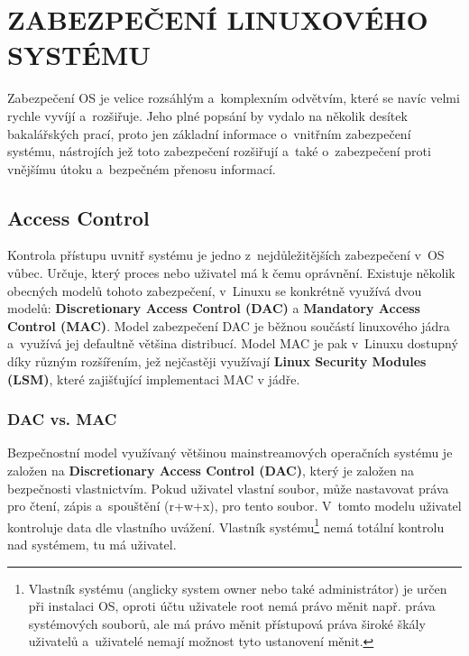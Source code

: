 \documentclass[a4paper,12pt]{article}
\newcommand{\upc}[1]{\uppercase{#1}} %
\renewcommand{\b}[1]{\textbf{#1}} %
\begin{document}
\section{\upc{Zabezpečení Linuxového systému}}
Zabezpečení OS je velice rozsáhlým a~komplexním odvětvím, které se navíc velmi rychle vyvíjí a~rozšiřuje. Jeho plné popsání by vydalo na několik desítek bakalářských prací, proto jen základní informace o~vnitřním zabezpečení systému, nástrojích jež toto zabezpečení rozšiřují a~také o~zabezpečení proti vnějšímu útoku a~bezpečném přenosu informací.
\subsection{Access Control}
Kontrola přístupu uvnitř systému je jedno z~nejdůležitějších zabezpečení v~OS vůbec. Určuje, který proces nebo uživatel má k čemu oprávnění. Existuje několik obecných modelů tohoto zabezpečení, v~Linuxu se konkrétně využívá dvou modelů: \b{Discretionary Access Control (DAC)} a \b{Mandatory Access Control (MAC)}. Model zabezpečení DAC je běžnou součástí linuxového jádra a~využívá jej defaultně většina distribucí. Model MAC je pak v~Linuxu dostupný díky různým rozšířením, jež nejčastěji využívají \b{Linux Security Modules (LSM)}, které zajišťující implementaci MAC v jádře.
\subsubsection{DAC vs. MAC}
Bezpečnostní model využívaný většinou mainstreamových operačních systému je založen na \b{Discretionary Access Control (DAC)}, který je založen na bezpečnosti vlastnictvím. Pokud uživatel vlastní soubor, může nastavovat práva pro čtení, zápis a~spouštění (r+w+x), pro tento soubor. V~tomto modelu uživatel kontroluje data dle vlastního uvážení. Vlastník systému\footnote{Vlastník systému (anglicky system owner nebo také administrátor) je určen při instalaci OS, oproti účtu uživatele root nemá právo měnit např. práva systémových souborů, ale má právo měnit přístupová práva široké škály uživatelů a~uživatelé nemají možnost tyto ustanovení měnit.\cite{SystemOwner}} nemá totální kontrolu nad systémem, tu má uživatel.~\cite{Linux_com_MACvsDAC}

\end{document}
